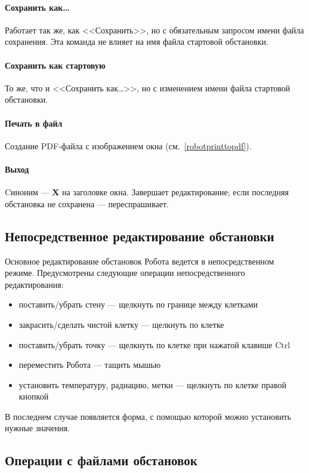 \documentclass[12pt,a4paper]{article}
\begin{document}
\paragraph{Сохранить как\dots} Работает так же, как <<Сохранить>>, но с обязательным запросом имени файла сохранения. Эта команда не влияет на имя файла стартовой обстановки.

\paragraph{Сохранить как стартовую} То же, что и <<Сохранить как\dots>>, но с изменением имени файла стартовой обстановки.

\paragraph{Печать в файл} Создание PDF-файла с изображением окна (см.~\ref{robotprinttopdf}).

\paragraph{Выход} Cиноним --- \textbf{\textsf{X}} на заголовке окна. Завершает редактирование; если последняя обстановка не сохранена --- переспрашивает.

\subsection{Непосредственное редактирование обстановки}

Основное редактирование обстановок Робота ведется в непосредственном режиме. Предусмотрены следующие операции непосредственного редактирования:
\begin{itemize}
\item поставить/убрать стену --- щелкнуть по границе между клетками
\item закрасить/сделать чистой клетку --- щелкнуть по клетке
\item поставить/убрать точку --- щелкнуть по клетке при нажатой клавише Ctrl
\item переместить Робота --- тащить мышью
\item установить температуру, радиацию, метки --- щелкнуть по клетке правой кнопкой
\end{itemize}

В последнем случае появляется форма, с помощью которой можно установить нужные значения.

\subsection{Операции с файлами обстановок}
\label{robotfieldfiles}
\end{document}
